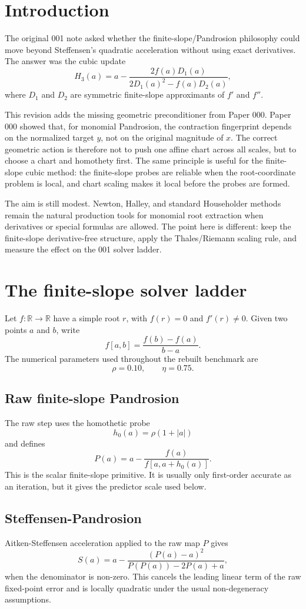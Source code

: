 \documentclass[11pt]{article}
\begin{document}
\section{Introduction}
The original 001 note asked whether the finite-slope/Pandrosion philosophy could move beyond Steffensen's quadratic acceleration without using exact derivatives.  The answer was the cubic update
\[
H_3(a)=a-\frac{2f(a)D_1(a)}{2D_1(a)^2-f(a)D_2(a)},
\]
where $D_1$ and $D_2$ are symmetric finite-slope approximants of $f'$ and $f''$.

This revision adds the missing geometric preconditioner from Paper 000.  Paper 000 showed that, for monomial Pandrosion, the contraction fingerprint depends on the normalized target $y$, not on the original magnitude of $x$.  The correct geometric action is therefore not to push one affine chart across all scales, but to choose a chart and homothety first.  The same principle is useful for the finite-slope cubic method: the finite-slope probes are reliable when the root-coordinate problem is local, and chart scaling makes it local before the probes are formed.

The aim is still modest.  Newton, Halley, and standard Householder methods remain the natural production tools for monomial root extraction when derivatives or special formulas are allowed.  The point here is different: keep the finite-slope derivative-free structure, apply the Thales/Riemann scaling rule, and measure the effect on the 001 solver ladder.

\section{The finite-slope solver ladder}
Let $f:\mathbb R\to\mathbb R$ have a simple root $r$, with $f(r)=0$ and $f'(r)\ne0$.  Given two points $a$ and $b$, write
\[
f[a,b]=\frac{f(b)-f(a)}{b-a}.
\]
The numerical parameters used throughout the rebuilt benchmark are
\[
\rho=0.10,\qquad \eta=0.75.
\]

\subsection{Raw finite-slope Pandrosion}
The raw step uses the homothetic probe
\[
h_0(a)=\rho(1+|a|)
\]
and defines
\[
P(a)=a-\frac{f(a)}{f[a,a+h_0(a)]}.
\]
This is the scalar finite-slope primitive.  It is usually only first-order accurate as an iteration, but it gives the predictor scale used below.

\subsection{Steffensen-Pandrosion}
Aitken-Steffensen acceleration applied to the raw map $P$ gives
\[
S(a)=a-\frac{(P(a)-a)^2}{P(P(a))-2P(a)+a},
\]
when the denominator is non-zero.  This cancels the leading linear term of the raw fixed-point error and is locally quadratic under the usual non-degeneracy assumptions.
\end{document}
